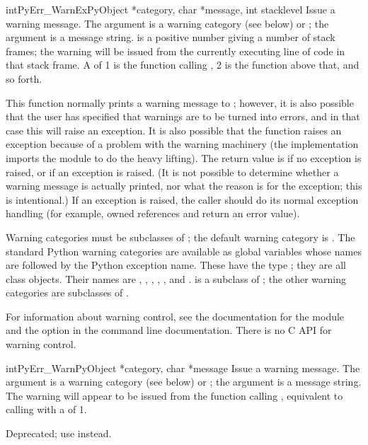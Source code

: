 \begin{cfuncdesc}{int}{PyErr_WarnEx}{PyObject *category, char *message, int stacklevel}
  Issue a warning message.  The  argument is a warning
  category (see below) or \NULL; the  argument is a
  message string.   is a positive number giving a
  number of stack frames; the warning will be issued from the 
  currently executing line of code in that stack frame.  A 
  of 1 is the function calling , 2 is 
  the function above that, and so forth.

  This function normally prints a warning message to ;
  however, it is also possible that the user has specified that
  warnings are to be turned into errors, and in that case this will
  raise an exception.  It is also possible that the function raises an
  exception because of a problem with the warning machinery (the
  implementation imports the  module to do the heavy
  lifting).  The return value is  if no exception is raised,
  or  if an exception is raised.  (It is not possible to
  determine whether a warning message is actually printed, nor what
  the reason is for the exception; this is intentional.)  If an
  exception is raised, the caller should do its normal exception
  handling (for example,  owned references and
  return an error value).

  Warning categories must be subclasses of ; the
  default warning category is .  The standard
  Python warning categories are available as global variables whose
  names are  followed by the Python exception name.
  These have the type ; they are all class objects.
  Their names are , ,
  , ,
  , and .
   is a subclass of ; the
  other warning categories are subclasses of .

  For information about warning control, see the documentation for the
   module and the  option in the
  command line documentation.  There is no C API for warning control.
\end{cfuncdesc}

\begin{cfuncdesc}{int}{PyErr_Warn}{PyObject *category, char *message}
  Issue a warning message.  The  argument is a warning
  category (see below) or \NULL; the  argument is a
  message string.  The warning will appear to be issued from the function
  calling , equivalent to calling
   with a  of 1.
  
  Deprecated; use  instead.
\end{cfuncdesc}

